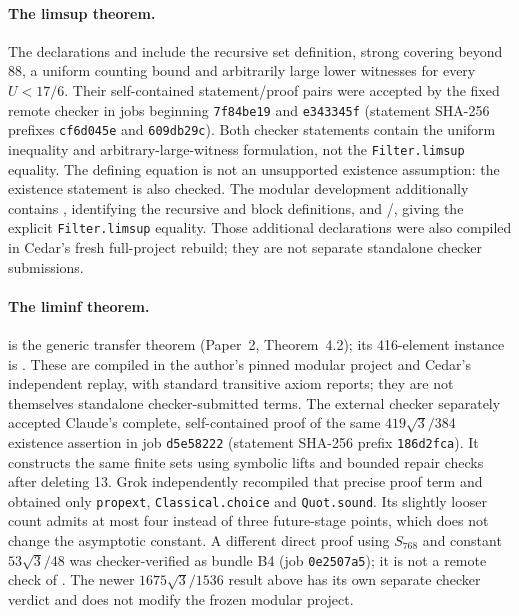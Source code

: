\documentclass[11pt]{article}
\begin{document}
\paragraph{The limsup theorem.}
The declarations  and  include the recursive set definition, strong covering beyond 88, a uniform counting bound and arbitrarily large lower witnesses for every $U<17/6$. Their self-contained statement/proof pairs were accepted by the fixed remote checker in jobs beginning \texttt{7f84be19} and \texttt{e343345f} (statement SHA-256 prefixes \texttt{cf6d045e} and \texttt{609db29c}). Both checker statements contain the uniform inequality and arbitrary-large-witness formulation, not the \texttt{Filter.limsup} equality. The defining equation is not an unsupported existence assumption: the existence statement is also checked. The modular development additionally contains , identifying the recursive and block definitions, and /, giving the explicit \texttt{Filter.limsup} equality. Those additional declarations were also compiled in Cedar's fresh full-project rebuild; they are not separate standalone checker submissions.

\paragraph{The liminf theorem.}
 is the generic transfer theorem (Paper~2, Theorem~4.2); its 416-element instance is . These are compiled in the author's pinned modular project and Cedar's independent replay, with standard transitive axiom reports; they are not themselves standalone checker-submitted terms. The external checker separately accepted Claude's complete, self-contained proof of the same $419\sqrt3/384$ existence assertion in job \texttt{d5e58222} (statement SHA-256 prefix \texttt{186d2fca}). It constructs the same finite sets using symbolic lifts and bounded repair checks after deleting 13. Grok independently recompiled that precise proof term and obtained only \texttt{propext}, \texttt{Classical.choice} and \texttt{Quot.sound}. Its slightly looser count admits at most four instead of three future-stage points, which does not change the asymptotic constant. A different direct proof using $S_{768}$ and constant $53\sqrt3/48$ was checker-verified as bundle B4 (job \texttt{0e2507a5}); it is not a remote check of . The newer $1675\sqrt3/1536$ result above has its own separate checker verdict and does not modify the frozen modular project.
\end{document}
